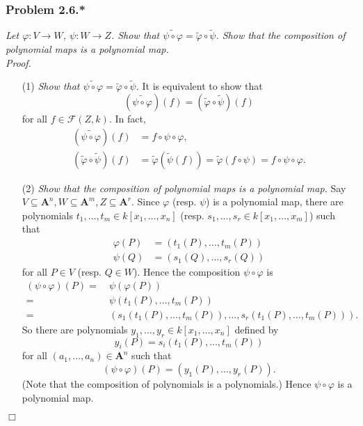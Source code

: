 \documentclass{article}
\begin{document}
\subsubsection*{Problem 2.6.*}
\emph{Let $\varphi: V \to W$, $\psi: W \to Z$.
Show that $\widetilde{\psi \circ \varphi} = \widetilde{\varphi} \circ \widetilde{\psi}$.
Show that the composition of polynomial maps is a polynomial map.} \\



\emph{Proof.}
\begin{enumerate}
\item[(1)]
  \emph{Show that $\widetilde{\psi \circ \varphi} = \widetilde{\varphi} \circ \widetilde{\psi}$.}
  It is equivalent to show that
  \[
    (\widetilde{\psi \circ \varphi})(f) = (\widetilde{\varphi} \circ \widetilde{\psi})(f)
  \]
  for all $f \in \mathscr{F}(Z,k)$.
  In fact,
  \begin{align*}
    (\widetilde{\psi \circ \varphi})(f)
    &= f \circ \psi \circ \varphi, \\
    (\widetilde{\varphi} \circ \widetilde{\psi})(f)
    &= \widetilde{\varphi} ( \widetilde{\psi}(f) )
    = \widetilde{\varphi} ( f \circ \psi )
    = f \circ \psi \circ \varphi.
  \end{align*}

\item[(2)]
  \emph{Show that the composition of polynomial maps is a polynomial map.}
  Say $V \subseteq \mathbf{A}^n, W \subseteq \mathbf{A}^m, Z \subseteq \mathbf{A}^r$.
  Since $\varphi$ (resp. $\psi$) is a polynomial map,
  there are polynomials $t_1,\ldots,t_m \in k[x_1,\ldots,x_n]$
  (resp. $s_1,\ldots,s_r \in k[x_1,\ldots,x_m]$)
  such that
  \begin{align*}
    \varphi(P)
    &= (t_1(P),\ldots,t_m(P)) \\
    \psi(Q)
    &= (s_1(Q),\ldots,s_r(Q))
  \end{align*}
  for all $P \in V$ (resp. $Q \in W$).
  Hence the composition $\psi \circ \varphi$ is
  \begin{align*}
    (\psi \circ \varphi)(P)
    =& \: \psi(\varphi(P)) \\
    =& \: \psi(t_1(P),\ldots,t_m(P)) \\
    =& \: (s_1(t_1(P),\ldots,t_m(P)), \ldots, s_r(t_1(P),\ldots,t_m(P))).
  \end{align*}
  So there are polynomials $y_1,\ldots,y_r \in k[x_1,\ldots,x_n]$
  defined by
  \[
    y_i(P) = s_i(t_1(P),\ldots,t_m(P))
  \]
  for all $(a_1,\ldots,a_n) \in \mathbf{A}^n$
  such that
  \[
    (\psi \circ \varphi)(P)
    = (y_1(P),\ldots,y_r(P)).
  \]
  (Note that the composition of polynomials is a polynomials.)
  Hence $\psi \circ \varphi$ is a polynomial map.
\end{enumerate}
$\Box$ \\\\
\end{document}
